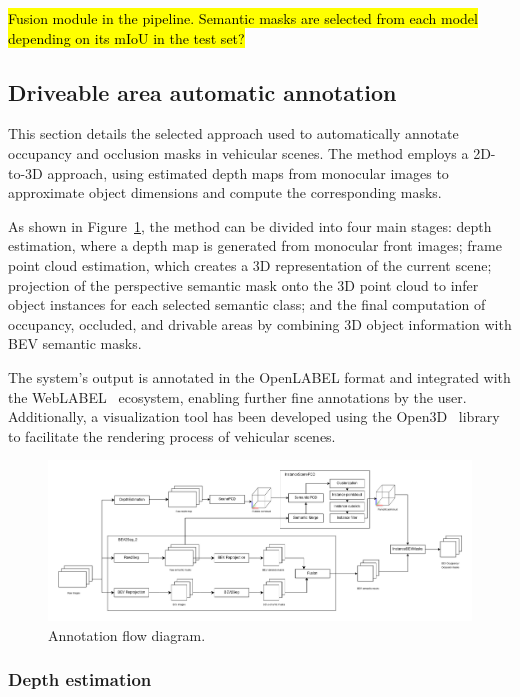 \hl{Fusion module in the pipeline. Semantic masks are selected from each model depending on its mIoU in the test set?}


\subsection{Driveable area automatic annotation}
\label{sec:aplication}

This section details the selected approach used to automatically annotate occupancy and occlusion masks in vehicular scenes. The method employs a 2D-to-3D approach, using estimated depth maps from monocular images to approximate object dimensions and compute the corresponding masks.

As shown in Figure~\ref{fig:application_flow_diagram}, the method can be divided into four main stages: depth estimation, where a depth map is generated from monocular front images; frame point cloud estimation, which creates a 3D representation of the current scene; projection of the perspective semantic mask onto the 3D point cloud to infer object instances for each selected semantic class; and the final computation of occupancy, occluded, and drivable areas by combining 3D object information with BEV semantic masks.

The system's output is annotated in the OpenLABEL format and integrated with the WebLABEL~\cite{weblabel} ecosystem, enabling further fine annotations by the user. Additionally, a visualization tool has been developed using the Open3D~\cite{open3d} library to facilitate the rendering process of vehicular scenes.

\begin{figure}[h!]
    \centering
    \includegraphics[width=\linewidth]{images/methodology/Application_flow_diagram.png}
    \caption{Annotation flow diagram.}
    \label{fig:application_flow_diagram}
\end{figure}

\subsubsection{Depth estimation}
\label{sec:depth_estimation}


